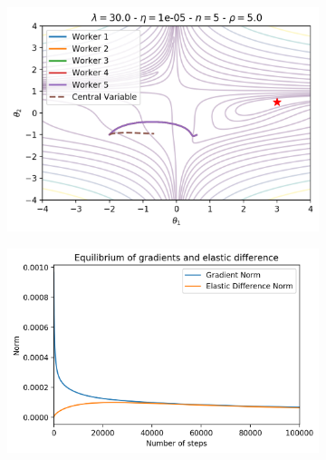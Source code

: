 \begin{figure}[H]
  \centering
  \begin{subfigure}{.45\textwidth}
    \centering
    \includegraphics[width=\linewidth]{resources/images/easgd_sync_norm_space.png}
  \end{subfigure}
  \begin{subfigure}{.45\textwidth}
    \centering
    \includegraphics[width=\linewidth]{resources/images/easgd_sync_norm_equilibrium.png}
  \end{subfigure}

\end{figure}
